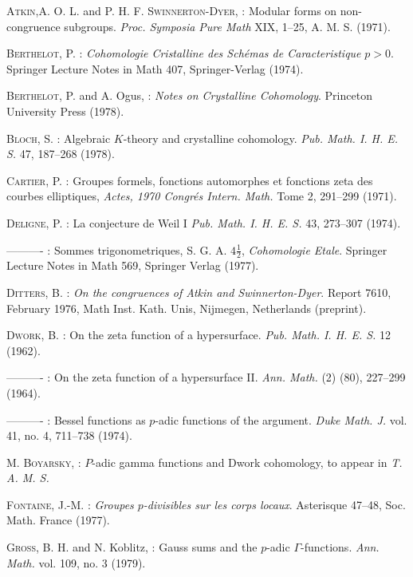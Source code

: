 \begin{thebibliography}{99}
 \textsc{Atkin,}\pageoriginale A. O. L. and P. H. F. \textsc{Swinnerton-Dyer,} : Modular forms on non-congruence subgroups. {\em Proc. Symposia Pure Math} XIX, 1--25, A. M. S. (1971).

 \textsc{Berthelot,} P. : {\em Cohomologie Cristalline des Sch\'emas de Caracteristique} $p>0$. Springer Lecture Notes in Math 407, Springer-Verlag (1974).

 \textsc{Berthelot,} P. and A. Ogus, : {\em Notes on Crystalline Cohomology}. Princeton University Press (1978).

 \textsc{Bloch,} S. : Algebraic $K$-theory and crystalline cohomology. {\em Pub. Math. I. H. E. S.} 47, 187--268 (1978).

 \textsc{Cartier,} P. : Groupes formels, fonctions automorphes et fonctions zeta des courbes elliptiques, {\em Actes, 1970 Congr\'es Intern. Math.} Tome 2, 291--299 (1971).

 \textsc{Deligne,} P. : La conjecture de Weil I {\em Pub. Math. I. H. E. S.} 43, 273--307 (1974).

 ---------- : Sommes trigonometriques, S. G. A. $4\frac{1}{2}$, {\em Cohomologie Etale}. Springer Lecture Notes in Math 569, Springer Verlag (1977).

 \textsc{Ditters,} B. : {\em On the congruences of Atkin and Swinnerton-Dyer}. Report 7610, February 1976, Math Inst. Kath. Unis, Nijmegen, Netherlands (preprint).

 \textsc{Dwork,} B. : On the zeta function of a hypersurface. {\em Pub. Math. I. H. E. S.} 12 (1962).

 ---------- : On the zeta function of a hypersurface II. {\em Ann. Math.} (2) (80), 227--299 (1964).

 ---------- : Bessel functions as $p$-adic functions of the argument. {\em Duke Math. J.} vol. 41, no. 4, 711--738 (1974).

 \textsc{M. Boyarsky,} : $P$-adic gamma functions and Dwork cohomology, to appear in {\em T. A. M. S.}

 \textsc{Fontaine,} J.-M. : {\em Groupes $p$-divisibles sur les corps locaux}. Asterisque 47--48, Soc. Math. France (1977).

 \textsc{Gross,} B. H. and N. Koblitz, : Gauss sums and the $p$-adic $\Gamma$-functions. {\em Ann. Math.} vol. 109, no. 3 (1979).


\end{thebibliography}
